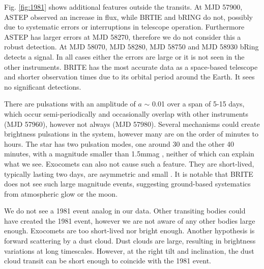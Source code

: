 Fig. \ref{fig:1981} shows additional features outside the transits. 
%
At MJD 57900, ASTEP observed an increase in flux, while BRTIE and bRING do not, possibly due to systematic errors or interruptions in telescope operation.
%
Furthermore ASTEP has larger errors at MJD 58270, therefore we do not consider this a robust detection.
%
At MJD 58070, MJD 58280, MJD 58750 and MJD 58930 bRing detects a signal. 
%
In all cases either the errors are large or it is not seen in the other instruments.
%
BRITE has the most accurate data as a space-based telescope and shorter observation times due to its orbital period around the Earth.
%
It sees no significant detections.


There are pulsations with an amplitude of $a$ $\sim$ 0.01 over a span of 5-15 days, which occur semi-periodically and occasionally overlap with other instruments (MJD 57960), however not always (MJD 57980).
%
Several mechanisms could create brightness pulsations in the \pic system, however many are on the order of minutes to hours.
%
The star has two pulsation modes, one around 30 and the other 40 minutes, with a magnitude smaller than 1.5mmag \citep{Koen_2003}, neither of which can explain what we see.
%
Exocomets can also not cause such a feature. 
%
They are short-lived, typically lasting two days, are asymmetric and small \citep[$<$2 mmag;][]{Heller_2024, Zieba_2019}.  
%
It is notable that BRITE does not see such large magnitude events, suggesting ground-based systematics from atmospheric glow or the moon. 
%



%
We do not see a 1981 event analog in our data.
%
%
%
%
%
Other transiting bodies could have created the 1981 event, however we are not aware of any other bodies large enough.  
%
Exocomets are too short-lived nor bright enough.  
%
Another hypothesis is forward scattering by a dust cloud.  
%
Dust clouds are large, resulting in brightness variations at long timescales.  
%
However, at the right tilt and inclination, the dust cloud transit can be short enough to coincide with the 1981 event.  
 

